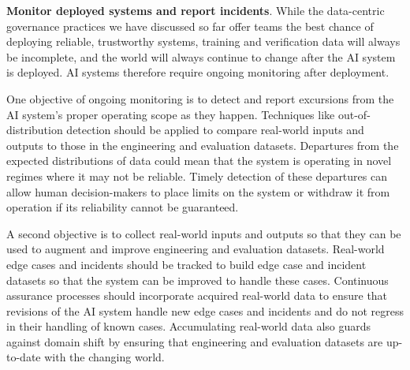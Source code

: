 
\textbf{Monitor deployed systems and report incidents}. While the data-centric governance practices we have discussed so far offer teams the best chance of deploying reliable, trustworthy systems, training and verification data will always be incomplete, and the world will always continue to change after the AI system is deployed. AI systems therefore require ongoing monitoring after deployment. 

One objective of ongoing monitoring is to detect and report excursions from the AI system's proper operating scope as they happen. Techniques like out-of-distribution detection should be applied to compare real-world inputs and outputs to those in the engineering and evaluation datasets. Departures from the expected distributions of data could mean that the system is operating in novel regimes where it may not be reliable. Timely detection of these departures can allow human decision-makers to place limits on the system or withdraw it from operation if its reliability cannot be guaranteed.

A second objective is to collect real-world inputs and outputs so that they can be used to augment and improve engineering and evaluation datasets. Real-world edge cases and incidents should be tracked to build edge case and incident datasets so that the system can be improved to handle these cases. Continuous assurance processes should incorporate acquired real-world data to ensure that revisions of the AI system handle new edge cases and incidents and do not regress in their handling of known cases. Accumulating real-world data also guards against domain shift by ensuring that engineering and evaluation datasets are up-to-date with the changing world.

